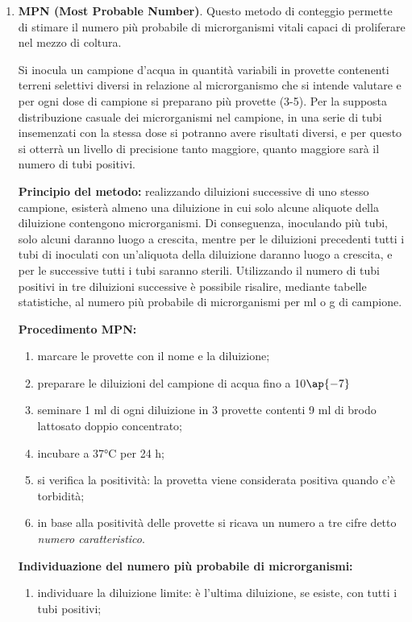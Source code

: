 \documentclass[11pt]{book}
\begin{document}
\begin{itemize}
\begin{enumerate}
\item \textbf{MPN (Most Probable Number)}. Questo metodo di conteggio permette di stimare il numero più probabile di microrganismi vitali capaci di proliferare nel mezzo di coltura.

Si inocula un campione d’acqua in quantità variabili in provette contenenti terreni selettivi diversi in relazione al microrganismo che si intende valutare e per ogni dose di campione si preparano più provette (3-5).
Per la supposta distribuzione casuale dei microrganismi nel campione, in una serie di tubi insemenzati con la stessa dose si potranno avere risultati diversi, e per questo si otterrà un livello di precisione tanto maggiore, quanto maggiore sarà il numero di tubi positivi.

\textbf{Principio del metodo:} realizzando diluizioni successive di uno stesso campione, esisterà almeno una diluizione in cui solo alcune aliquote della diluizione contengono microrganismi. Di conseguenza, inoculando più tubi, solo alcuni daranno luogo a crescita, mentre per le diluizioni precedenti tutti i tubi di inoculati con un’aliquota della diluizione daranno luogo a crescita, e per le successive tutti i tubi saranno sterili. Utilizzando il numero di tubi positivi in tre diluizioni successive è possibile risalire, mediante tabelle statistiche, al numero più probabile di microrganismi per ml o g di campione.

\textbf{Procedimento MPN:}
\begin{enumerate}
\item marcare le provette con il nome e la diluizione;
\item preparare le diluizioni del campione di acqua fino a 10$\ap{-7}$
\item seminare 1 ml di ogni diluizione in 3 provette contenti 9 ml di brodo lattosato doppio concentrato;
\item incubare a 37°C per 24 h;
\item si verifica la positività: la provetta viene considerata positiva quando c’è torbidità;
\item in base alla positività delle provette si ricava un numero a tre cifre detto \emph{numero caratteristico}.
\end{enumerate}

\textbf{Individuazione del numero più probabile di microrganismi:}
\begin{enumerate}
\item individuare la diluizione limite: è l’ultima diluizione, se esiste, con tutti i tubi positivi;


\end{enumerate}
\end{enumerate}
\end{itemize}
\end{document}
